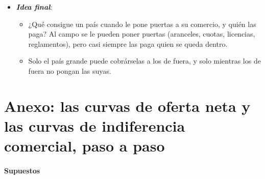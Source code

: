 \documentclass[11pt]{article}
\begin{document}
\begin{itemize}
\begin{itemize}
  \item El único argumento de eficiencia a favor del arancel, el del país grande, es el que más fácilmente acaba en una guerra comercial.
  \end{itemize}
\item \textbf{\emph{Idea final}}:
  \begin{itemize}
  \item ¿Qué consigue un país cuando le pone puertas a su comercio, y quién las paga? Al campo se le pueden poner puertas (aranceles, cuotas, licencias, reglamentos), pero casi siempre las paga quien se queda dentro.

  \item Solo el país grande puede cobrárselas a los de fuera, y solo mientras los de fuera no pongan las suyas.
  \end{itemize}
\end{itemize}

\clearpage
\appendix

\section{Anexo: las curvas de oferta neta\cortetitulo{} y las curvas de indiferencia comercial, paso a paso}\label{anexo:oferta-neta}

\paragraph{Supuestos}
\end{document}
